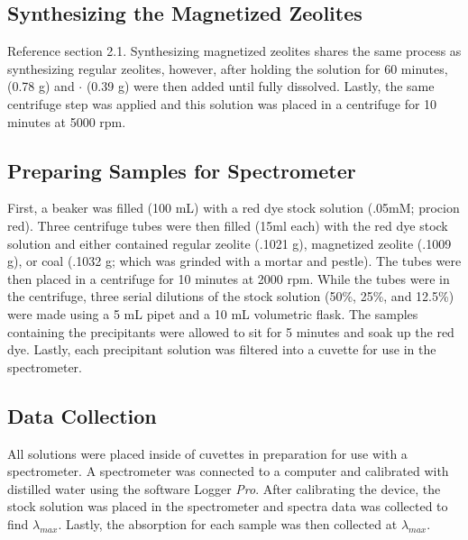 \documentclass[11pt]{article} %
\begin{document}
\subsection{Synthesizing the Magnetized Zeolites}
Reference section 2.1. Synthesizing magnetized zeolites shares the same process as synthesizing regular zeolites, however, after holding the solution for 60 minutes,  (0.78 g) and $\cdot$ (0.39 g) were then added until fully dissolved. Lastly, the same centrifuge step was applied and this solution was placed in a centrifuge for 10 minutes at 5000 rpm.

\subsection{Preparing Samples for Spectrometer}
First, a beaker was filled (\large 100 mL) with a red dye stock solution (.05mM; \large procion red). Three centrifuge tubes were then filled (\large 15ml each) with the red dye stock solution and either contained regular zeolite (.1021 g), magnetized zeolite (.1009 g), or coal (.1032 g; which was grinded with a mortar and pestle). The tubes were then placed in a centrifuge for 10 minutes at 2000 rpm. While the tubes were in the centrifuge, three serial dilutions of the stock solution (50\%, 25\%, and 12.5\%) were made using a 5 mL pipet and a 10 mL volumetric flask. The samples containing the precipitants were allowed to sit for 5 minutes and soak up the red dye. Lastly, each precipitant solution was filtered into a cuvette for use in the spectrometer.

\subsection{Data Collection}
All solutions were placed inside of cuvettes in preparation for use with a spectrometer. A spectrometer was connected to a computer and calibrated with distilled water using the software Logger \textit{Pro}. After calibrating the device, the stock solution was placed in the spectrometer and spectra data was collected to find $\lambda_{max}$. Lastly, the absorption for each sample was then collected at $\lambda_{max}$.

\end{document}
